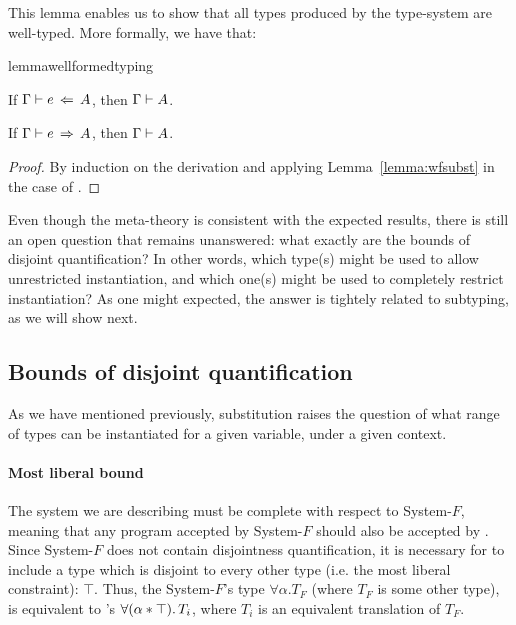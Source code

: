 This lemma enables us to show that all types produced by the type-system are well-typed.
More formally, we have that:

\begin{restatable}{lemma}{wellformedtyping}
  \label{lemma:wellformed-typing}

  If $\Gamma \vdash e \ \!\Leftarrow\! \ A$, then $\Gamma \vdash A$. 

  If $\Gamma \vdash e \ \!\Rightarrow\! \ A$, then $\Gamma \vdash A$.
\end{restatable}

\begin{proof}
  By induction on the derivation and applying
  Lemma~\ref{lemma:wfsubst} in the case of .
\end{proof}

Even though the meta-theory is consistent with the expected results, there is still an open
question that remains unanswered: what exactly are the bounds of disjoint quantification?
In other words, which type(s) might be used to allow unrestricted instantiation, and which
one(s) might be used to completely restrict instantiation?
As one might expected, the answer is tightely related to subtyping, as we will show next. 

\subsection{Bounds of disjoint quantification}
As we have mentioned previously, substitution raises the question of what range of types can be 
instantiated for a given variable, under a given context.

\paragraph{Most liberal bound}
The system we are describing must be complete with respect to System-$F$, meaning that any
program accepted by System-$F$ should also be accepted by \name.
Since System-$F$ does not contain disjointness quantification, it is necessary for \name to 
include a type which is disjoint to every other type (i.e. the most liberal constraint): $\top$.
Thus, the System-$F$'s type $\forall \alpha. {T_F}$ (where ${T_F}$ is some other type), is
equivalent to \name's $\forall (\alpha * \top).\, T_i$, where ${T_i}$ is an equivalent translation of
$T_{F}$.

